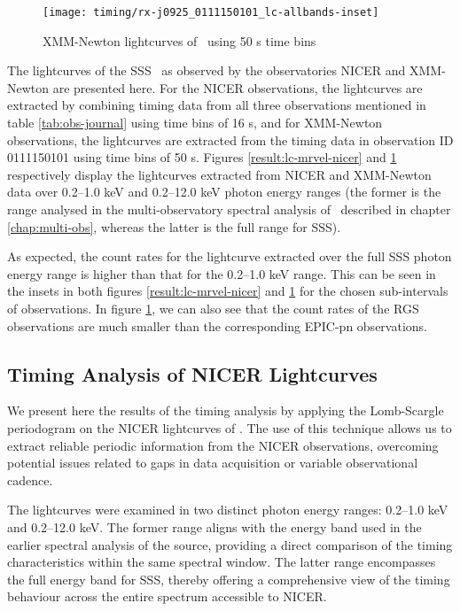 			\begin{figure}[h!]
				\centering
				\texttt{[image: timing/rx-j0925\_0111150101\_lc-allbands-inset]}
				\caption{XMM-Newton lightcurves of \source\ using 50 s time bins}
				\label{result:lc-mrvel-xmm}
			\end{figure}
			
			The lightcurves of the SSS \source\ as observed by the observatories NICER and XMM-Newton are presented here. For the NICER observations, the lightcurves are extracted by combining timing data from all three observations mentioned in table \ref{tab:obs-journal} using time bins of 16 s, and for XMM-Newton observations, the lightcurves are extracted from the timing data in observation ID 0111150101 using time bins of 50 s. Figures \ref{result:lc-mrvel-nicer} and \ref{result:lc-mrvel-xmm} respectively display the lightcurves extracted from NICER and XMM-Newton data over 0.2--1.0 keV and 0.2--12.0 keV photon energy ranges (the former is the range analysed in the multi-observatory spectral analysis of \source\ described in chapter \ref{chap:multi-obs}, whereas the latter is the full range for SSS).
			
			As expected, the count rates for the lightcurve extracted over the full SSS photon energy range is higher than that for the 0.2--1.0 keV range. This can be seen in the insets in both figures \ref{result:lc-mrvel-nicer} and \ref{result:lc-mrvel-xmm} for the chosen sub-intervals of observations. In figure \ref{result:lc-mrvel-xmm}, we can also see that the count rates of the RGS observations are much smaller than the corresponding EPIC-pn observations.
			
		\subsection{Timing Analysis of NICER Lightcurves}		
			We present here the results of the timing analysis by applying the Lomb-Scargle periodogram on the NICER lightcurves of \source. The use of this technique allows us to extract reliable periodic information from the NICER observations, overcoming potential issues related to gaps in data acquisition or variable observational cadence.
			
			The lightcurves were examined in two distinct photon energy ranges: 0.2--1.0 keV and 0.2--12.0 keV. The former range aligns with the energy band used in the earlier spectral analysis of the source, providing a direct comparison of the timing characteristics within the same spectral window. The latter range encompasses the full energy band for SSS, thereby offering a comprehensive view of the timing behaviour across the entire spectrum accessible to NICER.
			
